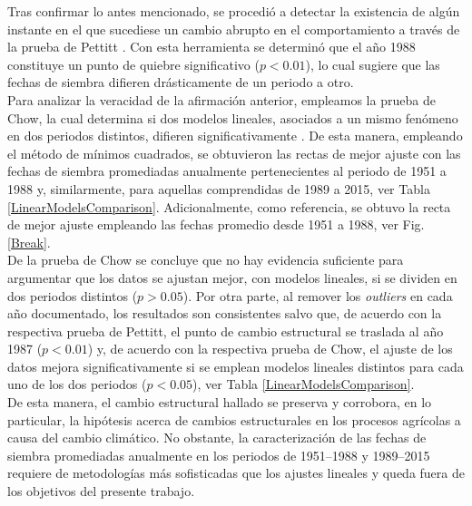 Tras confirmar lo antes mencionado, se procedió a detectar la existencia de algún instante en el que sucediese un cambio abrupto en el comportamiento a través de la prueba de Pettitt \cite{Kundzewicz_2004}. Con esta herramienta se determinó que el año 1988 constituye un punto de quiebre significativo ($p<0.01$), lo cual sugiere que las fechas de siembra difieren drásticamente de un periodo a otro.\\

Para analizar la veracidad de la afirmación anterior, empleamos la prueba de Chow, la cual determina si dos modelos lineales, asociados a un mismo fenómeno en dos periodos distintos, difieren significativamente \cite{Chow_1960, Rapach_2006}. De esta manera, empleando el método de mínimos cuadrados, se obtuvieron las rectas de mejor ajuste con las fechas de siembra promediadas anualmente pertenecientes al periodo de 1951 a 1988 y, similarmente, para aquellas comprendidas de 1989 a 2015, ver Tabla \ref{LinearModelsComparison}. Adicionalmente, como referencia, se obtuvo la recta de mejor ajuste empleando las fechas promedio desde 1951 a 1988, ver Fig. \ref{Break}.\\

De la prueba de Chow se concluye que no hay evidencia suficiente para argumentar que los datos se ajustan mejor, con modelos lineales, si se dividen en dos periodos distintos ($p>0.05$). Por otra parte, al remover los \textit{outliers} en cada año documentado, los resultados son consistentes salvo que, de acuerdo con la respectiva prueba de Pettitt, el punto de cambio estructural se traslada al año 1987 ($p<0.01$) y, de acuerdo con la respectiva prueba de Chow, el ajuste de los datos mejora significativamente si se emplean modelos lineales distintos para cada uno de los dos periodos ($p<0.05$), ver Tabla \ref{LinearModelsComparison}.\\


De esta manera, el cambio estructural hallado se preserva y corrobora, en lo particular, la hipótesis acerca de cambios estructurales en los procesos agrícolas a causa del cambio climático. No obstante, la caracterización de las fechas de siembra promediadas anualmente en los periodos de 1951--1988 y 1989--2015 requiere de metodologías más sofisticadas que los ajustes lineales y queda fuera de los objetivos del presente trabajo.\\